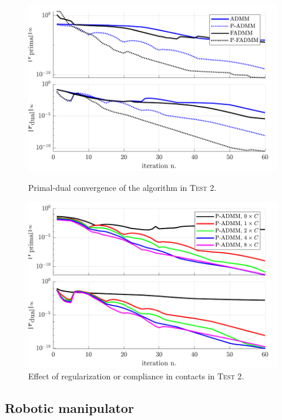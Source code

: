 \documentclass[AMA,STIX1COL]{WileyNJD-v2}
\begin{document}
\begin{figure}[!tbp]
  \centering
  \begin{minipage}[t]{0.48\textwidth}
    \includegraphics[width=\textwidth]{pics/t8_primdual.pdf}
    \caption{Primal-dual convergence of the algorithm in \textsc{Test 2}.}
		\label{fig:t8_primdual}
  \end{minipage}
  \hfill
	\begin{minipage}[t]{0.48\textwidth}
    \includegraphics[width=\textwidth]{pics/t8_compliance.pdf}
    \caption{Effect of regularization or compliance in contacts in \textsc{Test 2}.}
  \end{minipage}
\end{figure}


\subsection{Robotic manipulator}
\end{document}
